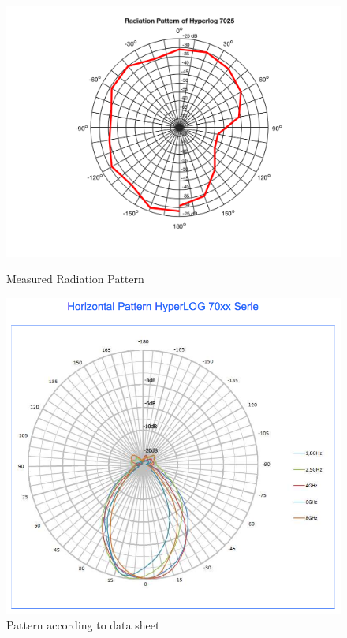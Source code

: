 \begin{figure}[h!]
    \centering
    \begin{minipage}{0.45\textwidth}
        \centering
		\includegraphics[width=\textwidth+6em]{images/hyperlog.png}
		\caption{Measured Radiation Pattern}
		\label{fig:hyper}
    \end{minipage}\hfill
    \begin{minipage}{0.45\textwidth}
		\includegraphics[width=\textwidth]{images/hyperlog_ds.png}
		\caption{Pattern according to data sheet\protect\footnotemark}
		\label{fig:hyper_sheet}
    \end{minipage}
\end{figure}

